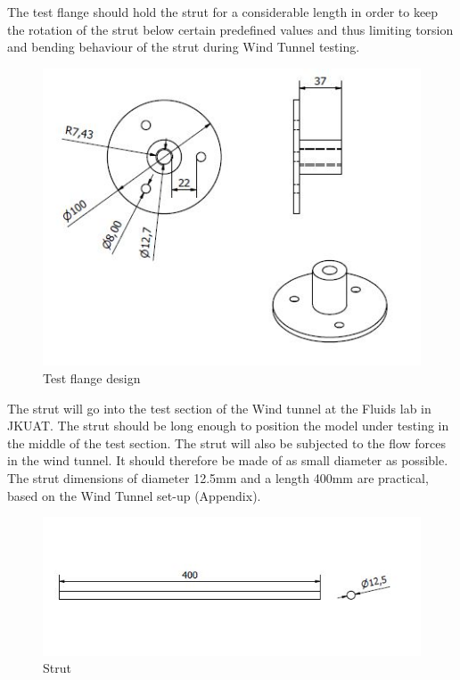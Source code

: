 The test flange should hold the strut for a considerable length in order to keep the rotation of the strut below certain predefined values and thus limiting torsion and bending behaviour of the strut during Wind Tunnel testing.
\begin{center}
	\begin{figure}[H]
	\centering
	\includegraphics[width=0.75\linewidth]{Figures/Test}
	\caption[Test flange]{Test flange design}
	\end{figure}
\end{center}
The strut will go into the test section of the Wind tunnel at the Fluids lab in JKUAT. The strut should be long enough to position the model under testing in the middle of the test section. The strut will also be subjected to the flow forces in the wind tunnel. It should therefore be made of as small diameter as possible. The strut dimensions of diameter 12.5mm and a length 400mm are practical, based on the Wind Tunnel set-up (Appendix).
\begin{center}
	\begin{figure}[H]
	\centering
	\includegraphics[width=0.75\linewidth]{Figures/Strut}
	\caption[Strut]{Strut}
	\end{figure}
\end{center}

